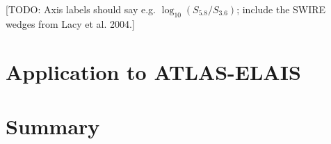 \documentclass[fleqn,usenatbib,usedcolumn]{mnras}
\begin{document}
  {[}TODO: Axis labels should say e.g. \(\log_{10}(S_{5.8}/S_{3.6})\);
  include the SWIRE wedges from Lacy et al. 2004.{]} 

\section{Application to ATLAS-ELAIS}

\section{Summary}
% 





\bsp	%
\label{lastpage}
\end{document}
